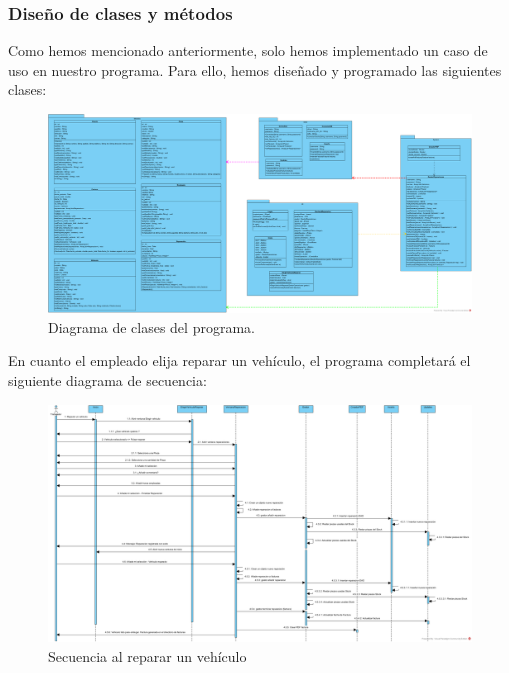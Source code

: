 \documentclass{article}
\begin{document}
\subsubsection{Diseño de clases y métodos}
\label{subsubsection:designClass}
Como hemos mencionado anteriormente, solo hemos implementado un caso de uso en nuestro programa. Para ello, hemos diseñado y programado las siguientes clases: 
\begin{figure}[H]
  \centering
  \includegraphics[width=1.0\textwidth]{program/DiagramaDeClasesTaller.png}
  \caption{Diagrama de clases del programa.}
\end{figure}
En cuanto el empleado elija reparar un vehículo, el programa completará el siguiente diagrama de secuencia:
\begin{figure}[H]
  \centering
  \includegraphics[width=1.0\textwidth]{program/SecuenciaRepararvehiculo.png}
  \caption{Secuencia al reparar un vehículo}
\end{figure}
\end{document}
